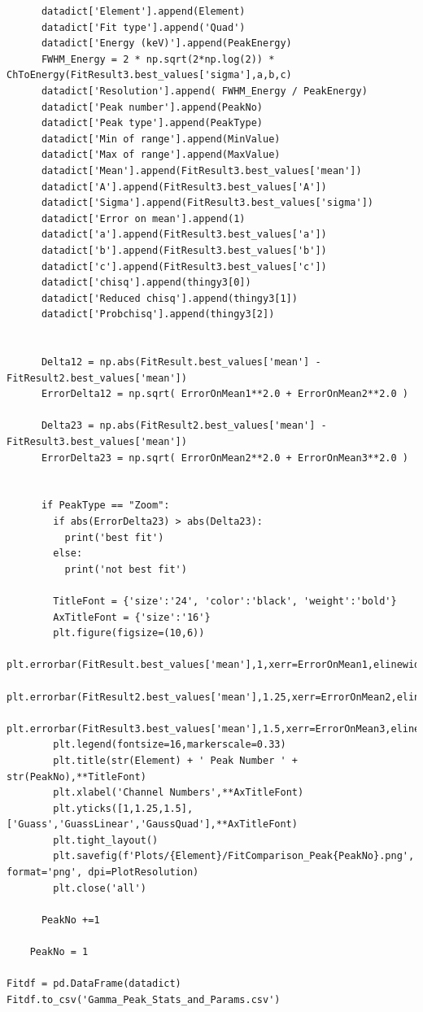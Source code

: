 \documentclass[11pt,a4paper]{article}
\begin{document}
\begin{verbatim}
      datadict['Element'].append(Element)
      datadict['Fit type'].append('Quad')
      datadict['Energy (keV)'].append(PeakEnergy)
      FWHM_Energy = 2 * np.sqrt(2*np.log(2)) * ChToEnergy(FitResult3.best_values['sigma'],a,b,c)
      datadict['Resolution'].append( FWHM_Energy / PeakEnergy)
      datadict['Peak number'].append(PeakNo)
      datadict['Peak type'].append(PeakType)
      datadict['Min of range'].append(MinValue)
      datadict['Max of range'].append(MaxValue)
      datadict['Mean'].append(FitResult3.best_values['mean'])
      datadict['A'].append(FitResult3.best_values['A'])
      datadict['Sigma'].append(FitResult3.best_values['sigma'])
      datadict['Error on mean'].append(1)
      datadict['a'].append(FitResult3.best_values['a'])
      datadict['b'].append(FitResult3.best_values['b'])
      datadict['c'].append(FitResult3.best_values['c'])
      datadict['chisq'].append(thingy3[0])
      datadict['Reduced chisq'].append(thingy3[1])
      datadict['Probchisq'].append(thingy3[2])
      

      Delta12 = np.abs(FitResult.best_values['mean'] - FitResult2.best_values['mean'])
      ErrorDelta12 = np.sqrt( ErrorOnMean1**2.0 + ErrorOnMean2**2.0 )

      Delta23 = np.abs(FitResult2.best_values['mean'] - FitResult3.best_values['mean'])
      ErrorDelta23 = np.sqrt( ErrorOnMean2**2.0 + ErrorOnMean3**2.0 )


      if PeakType == "Zoom":
        if abs(ErrorDelta23) > abs(Delta23):
          print('best fit')
        else:
          print('not best fit')
            
        TitleFont = {'size':'24', 'color':'black', 'weight':'bold'} 
        AxTitleFont = {'size':'16'}
        plt.figure(figsize=(10,6))
        plt.errorbar(FitResult.best_values['mean'],1,xerr=ErrorOnMean1,elinewidth=6,capsize=10,capthick=5,marker='o',markersize=20,label="Gauss")
        plt.errorbar(FitResult2.best_values['mean'],1.25,xerr=ErrorOnMean2,elinewidth=6,capsize=10,capthick=5,marker='o',markersize=20,label="GaussLinear")
        plt.errorbar(FitResult3.best_values['mean'],1.5,xerr=ErrorOnMean3,elinewidth=6,capsize=10,capthick=5,marker='o',markersize=20,label="GaussQuad")
        plt.legend(fontsize=16,markerscale=0.33)
        plt.title(str(Element) + ' Peak Number ' + str(PeakNo),**TitleFont)
        plt.xlabel('Channel Numbers',**AxTitleFont)
        plt.yticks([1,1.25,1.5],['Guass','GuassLinear','GaussQuad'],**AxTitleFont)
        plt.tight_layout()
        plt.savefig(f'Plots/{Element}/FitComparison_Peak{PeakNo}.png', format='png', dpi=PlotResolution)
        plt.close('all')
      
      PeakNo +=1

    PeakNo = 1

Fitdf = pd.DataFrame(datadict)
Fitdf.to_csv('Gamma_Peak_Stats_and_Params.csv')
\end{verbatim}
\end{document}

